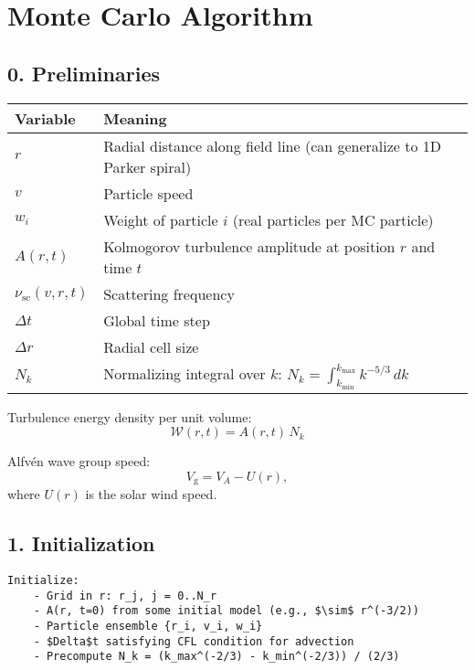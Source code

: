 \hrulefill

\section*{\texorpdfstring{ \textbf{Monte Carlo Algorithm}}{}}

\hrulefill

\subsection*{0. \textbf{Preliminaries}}

\begin{center}
\begin{tabular}{@{}ll@{}}
\toprule
\textbf{Variable} & \textbf{Meaning} \\
\midrule
$r$ & Radial distance along field line (can generalize to 1D Parker spiral) \\
$v$ & Particle speed \\
$w_i$ & Weight of particle $i$ (real particles per MC particle) \\
$A(r,t)$ & Kolmogorov turbulence amplitude at position $r$ and time $t$ \\
$\nu_{\text{sc}}(v,r,t)$ & Scattering frequency \\
$\Delta t$ & Global time step \\
$\Delta r$ & Radial cell size \\
$N_k$ & Normalizing integral over $k$: $N_k = \int_{k_{\min}}^{k_{\max}} k^{-5/3} \, dk$ \\
\bottomrule
\end{tabular}
\end{center}

Turbulence energy density per unit volume:
\begin{equation}
\mathcal{W}(r,t) = A(r,t)\,N_k
\tag{1}
\end{equation}

Alfvén wave group speed:
\[
V_{\text{g}} = V_A - U(r),
\]
where $U(r)$ is the solar wind speed.

\hrulefill

\subsection*{1. \textbf{Initialization}}

\begin{verbatim}
Initialize:
    - Grid in r: r_j, j = 0..N_r
    - A(r, t=0) from some initial model (e.g., $\sim$ r^(-3/2))
    - Particle ensemble {r_i, v_i, w_i}
    - $Delta$t satisfying CFL condition for advection
    - Precompute N_k = (k_max^(-2/3) - k_min^(-2/3)) / (2/3)
\end{verbatim}

